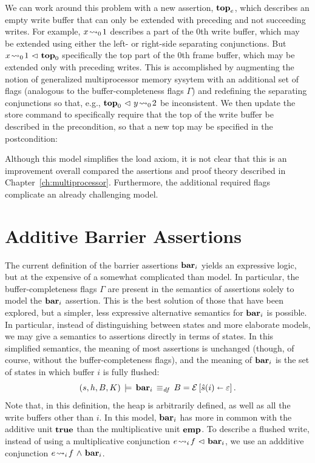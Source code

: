 \documentclass[11pt]{report}
\begin{document}
We can work around this problem with a new assertion, $\mathbf{top}_{e}$, which describes an empty write buffer that can only be extended with preceding and not succeeding writes. For example, $x \!\leadsto_{0}\! 1$ describes a part of the 0th write buffer, which may be extended using either the left- or right-side separating conjunctions. But $x \!\leadsto_{0}\! 1 \operatorname{\,\vartriangleleft\,} \mathbf{top}_{0}$ specifically the top part of the 0th frame buffer, which may be extended only with preceding writes. This is accomplished by augmenting the notion of generalized multiprocessor memory sysytem with an additional set of flags (analogous to the buffer-completeness flags $\Gamma$) and redefining the separating conjunctions so that, e.g., $\mathbf{top}_{0} \operatorname{\,\vartriangleleft\,} y \!\leadsto_{0}\! 2$ be inconsistent. We then update the store command to specifically require that the top of the write buffer be described in the precondition, so that a new top may be specified in the postcondition: 

Although this model simplifies the load axiom, it is not clear that this is an improvement overall compared the assertions and proof theory described in Chapter~\ref{ch:multiprocessor}. Furthermore, the additional required flags complicate an already challenging model. 

\section{Additive Barrier Assertions} 
\label{sec:additive-barriers}

The current definition of the barrier assertions $\mathbf{bar}_{i}$ yields an expressive logic, but at the expensive of a somewhat complicated than model. In particular, the buffer-completeness flags $\Gamma$ are present in the semantics of assertions solely to model the $\mathbf{bar}_{i}$ assertion. This is the best solution of those that have been explored, but a simpler, less expressive alternative semantics for $\mathbf{bar}_{i}$ is possible. In particular, instead of distinguishing between states and more elaborate models, we may give a semantics to assertions directly in terms of states. In this simplified semantics, the meaning of most assertions is unchanged (though, of course, without the buffer-completeness flags), and the meaning of $\mathbf{bar}_{i}$ is the set of states in which buffer $i$ is fully flushed: \[ (s,h,B,K) \,\models\, \mathbf{bar}_{i} \operatorname{\;\equiv_{\mathit{df}}\;} B = \mathcal{E} \left[ \hat{s}(i) \shortleftarrow \varepsilon \right].\] Note that, in this definition, the heap is arbitrarily defined, as well as all the write buffers other than $i$. In this model, $\mathbf{bar}_{i}$ has more in common with the additive unit $\mathbf{true}$ than the multiplicative unit $\mathbf{emp}$. To describe a flushed write, instead of using a multiplicative conjunction $e \!\leadsto_{i}\! f \operatorname{\,\vartriangleleft\,} \mathbf{bar}_{i}$, we use an addditive conjunction $e \!\leadsto_{i}\! f \operatorname{\,\wedge\,} \mathbf{bar}_{i}$. 
\end{document}
